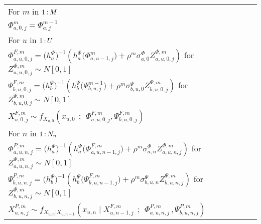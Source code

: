 \documentclass[12pt]{article}\usepackage[]{graphicx}\usepackage[table]{xcolor}
\newcommand\mycolon{{\hspace{0.6mm}:\hspace{0.6mm}}}
\newcommand\np{j}
\newcommand\unit{u} %
\newcommand\Unit{U} %
\renewcommand\time{n}
\newcommand\nmif{m} %
\newcommand\Shared{\Phi}
\newcommand\Specific{\Psi}
\newcommand\nshared{a}
\newcommand\nspecific{b}
\newcommand\mystretch{\rule[-2mm]{0mm}{5mm} }
\newcommand\myBigStretch{\rule[-3mm]{0mm}{5mm} }
\newcommand\asp{\hspace{6mm}}
\newcommand\giventh{{\,;\,}}
\begin{document}
\begin{algorithm}[t!]
\noindent\begin{tabular}{l}
For $\nmif$ in $1\mycolon M$\rule[0mm]{0mm}{5mm}\\
\asp $\Shared^m_{\nshared,0,\np}=\Shared^{m-1}_{\nshared,\np}$
\mystretch\\
\asp For $\unit$ in $1\mycolon \Unit$\\
\asp \asp $\Shared^{F,m}_{\nshared,\unit,0,j} =\big(h^{\Shared}_{\nshared}\big)^{-1}
  \left(
  h^\Shared_\nshared \big(\Shared^{m}_{\nshared,\unit-1,\np}\big)+
    \rho^{m}\sigma^{\Shared}_{\nshared,0} Z^{\Shared,m}_{\nshared,\unit,0,\np}
  \right)$ for $ Z^{\Shared,m}_{\nshared,\unit,0,\np}\sim N[0,1]$ \myBigStretch\\
\asp \asp $\Specific^{F,m}_{\nspecific,\unit,0,j} =\big(h^{\Specific}_{\nspecific}\big)^{-1}
  \left(
  h^\Specific_\nspecific \big(\Specific^{m-1}_{\nspecific,\unit,\np}\big)+
    \rho^{m}\sigma^{\Specific}_{\nspecific,u,0} Z^{\Specific,m}_{\nspecific,\unit,0,\np}
  \right)$ for $ Z^{\Specific,m}_{\nspecific,\unit,0,\np}\sim N[0,1]$ \myBigStretch\\
\asp \asp $X_{\unit,0,j}^{F,m}\sim f_{X_{\unit,0}}
  \left(
    x_{\unit,0} \; \giventh \; \Shared^{F,m}_{\nshared,\unit,0,j} ,
    \Specific^{F,m}_{\nspecific,\unit,0,j}
  \right)$ \myBigStretch\\
\asp \asp For $n$ in $1\mycolon N_{\unit}$\\
\asp \asp \asp $\Shared^{P,m}_{\nshared,\unit,\time,j} =\big(h^{\Shared}_{\nshared}\big)^{-1}
  \left(
  h^\Shared_\nshared \big(\Shared^{F,m}_{\nshared,\unit,\time-1,\np}\big)+
    \rho^{m}\sigma^{\Shared}_{\nshared,\time} Z^{\Shared,m}_{\nshared,\unit,\time,\np}
  \right)$ for $ Z^{\Shared,m}_{\nshared,\unit,\time,\np}\sim N[0,1]$ \myBigStretch\\
\asp \asp \asp $\Specific^{P,m}_{\nspecific,\unit,\time,j} =\big(h^{\Specific}_{\nspecific}\big)^{-1}
  \left(
  h^\Specific_\nspecific \big(\Specific^{F,m}_{\nspecific,\unit,\time-1,\np}\big)+
    \rho^{m}\sigma^{\Specific}_{\nspecific,u,\time} Z^{\Specific,m}_{\nspecific,\unit,\time,\np}
  \right)$ for $ Z^{\Specific,m}_{\nspecific,\unit,\time,\np}\sim N[0,1]$ \myBigStretch\\
\asp \asp \asp $X_{\unit,n,j}^{P,m}\sim f_{X_{\unit,n}|X_{\unit,n-1}}
   \left(
     x_{\unit,n} \; \big| \; X^{F,m}_{\unit,n-1,j} \; \giventh \;
     \Shared^{P,m}_{\nshared,\unit,\time,j} \, ,
     \Specific^{P,m}_{\nspecific,\unit,\time,j}
   \right)$  \myBigStretch\\

\end{tabular}
\end{algorithm}
\end{document}
